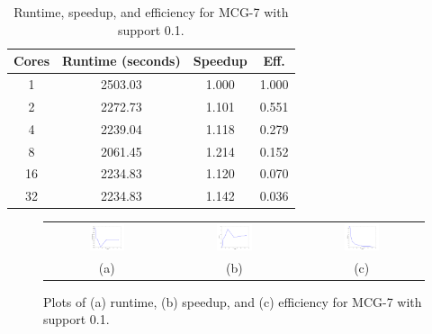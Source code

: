\begin{table}
\centering
\begin{tabular}{cccc}
\hline
Cores & Runtime (seconds) & Speedup &  Eff.  \\
\hline
 1    & 2503.03 & 1.000  & 1.000 \\
 2    & 2272.73 & 1.101  & 0.551 \\
 4    & 2239.04 & 1.118  & 0.279 \\
 8    & 2061.45 & 1.214  & 0.152 \\
16    & 2234.83 & 1.120  & 0.070 \\
32    & 2234.83 & 1.142  & 0.036 \\
\hline
\end{tabular}
\caption{Runtime, speedup, and efficiency for MCG-7 with support
         0.1.}
\label{tab:mcg7}
\end{table}

\begin{figure}
\centering
\begin{tabular}{ccc}
\includegraphics[width=0.3\textwidth]{mcg7_time.png} &
\includegraphics[width=0.3\textwidth]{mcg7_speedup.png} &
\includegraphics[width=0.3\textwidth]{mcg7_efficiency.png} \\
(a) & (b) & (c) \\
\end{tabular}
\caption{Plots of (a) runtime, (b) speedup, and (c) efficiency for
         MCG-7 with support 0.1.}
\label{fig:mcg7}
\end{figure}
